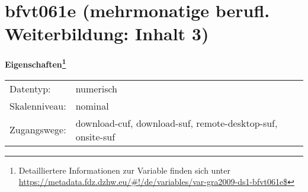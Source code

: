 
    \setcounter{footnote}{0}

    \vspace*{-1.8cm}
	\section{bfvt061e (mehrmonatige berufl. Weiterbildung: Inhalt 3)}
	\label{section:bfvt061e}



    \vspace*{0.5cm}
    \noindent\textbf{Eigenschaften\footnote{Detailliertere Informationen zur Variable finden sich unter
		\url{https://metadata.fdz.dzhw.eu/\#!/de/variables/var-gra2009-ds1-bfvt061e$}}}\\
	\begin{tabularx}{\hsize}{@{}lX}
	Datentyp: & numerisch \\
	Skalenniveau: & nominal \\
	Zugangswege: &
	  download-cuf, 
	  download-suf, 
	  remote-desktop-suf, 
	  onsite-suf
 \\
    \end{tabularx}



